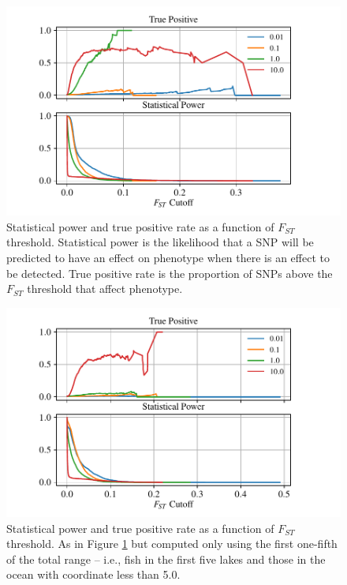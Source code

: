 \documentclass{article}
\begin{document}
\begin{figure}
    \begin{center}
          \includegraphics{Final_Plots/True_Power_0_25_500.pdf}
          \caption{ 
        Statistical power and true positive rate as a function of $F_{ST}$ threshold. 
        Statistical power is the likelihood that a SNP will be predicted to have an effect on phenotype when there is an effect to be detected.
        True positive rate is the proportion of SNPs above the $F_{ST}$ threshold that affect phenotype.
          \label{fig:Power_FP}
          }
    \end{center}
\end{figure}

\begin{figure}
    \begin{center}
        \includegraphics{Final_Plots/True_Power_0_5_500.pdf}
          \caption{ 
        Statistical power and true positive rate as a function of $F_{ST}$ threshold. As in Figure \ref{fig:Power_FP}
        but computed only using the first one-fifth of the total range -- i.e., fish in the first five lakes and those in the ocean with coordinate less than 5.0.
         	}
          \label{fig:Power_FP_5lakes}
    \end{center}
\end{figure}
\end{document}
